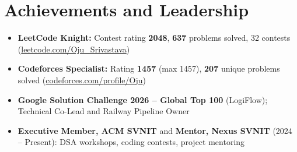 \documentclass[a4paper,10pt]{article}
\begin{document}
\section{Achievements and Leadership}
\small
\begin{itemize}
  \item \textbf{LeetCode Knight:} Contest rating \textbf{2048}, \textbf{637} problems solved, 32 contests (\href{https://leetcode.com/Oju_Srivastava}{leetcode.com/Oju\_Srivastava})
  \item \textbf{Codeforces Specialist:} Rating \textbf{1457} (max 1457), \textbf{207} unique problems solved (\href{https://codeforces.com/profile/Oju}{codeforces.com/profile/Oju})
  \item \textbf{Google Solution Challenge 2026 -- Global Top 100} (LogiFlow); Technical Co-Lead and Railway Pipeline Owner
  \item \textbf{Executive Member, ACM SVNIT} and \textbf{Mentor, Nexus SVNIT} (2024 -- Present): DSA workshops, coding contests, project mentoring
\end{itemize}
\end{document}

